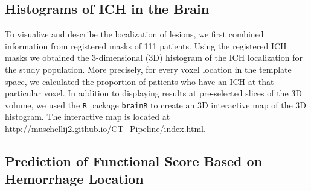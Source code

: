\documentclass[10pt]{article}\usepackage[]{graphicx}\usepackage[]{color}
\begin{document}




\subsection{Histograms of ICH in the Brain}

To visualize and describe the localization of lesions, we first combined information from registered masks of 111 patients.  Using the registered ICH masks we obtained the $3$-dimensional (3D) histogram of the ICH localization for the study population. More precisely, for every voxel location in the template space, we calculated the proportion of patients who have an ICH at that particular voxel.  In addition to displaying results at pre-selected slices of the 3D volume, we used the \verb|R| package \verb|brainR| to create an 3D interactive map of the 3D histogram.  The interactive map is located at \url{http://muschellij2.github.io/CT_Pipeline/index.html}.  


\subsection{Prediction of Functional Score Based on Hemorrhage Location}
\end{document}
